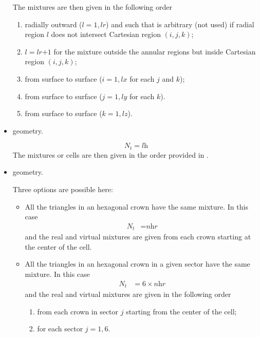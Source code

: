 \begin{itemize}
The mixtures are then given in the following order
\begin{enumerate}
\item radially outward ($l=1,\textit{lr}$) and such that  is arbitrary (not used) if radial region $l$ does not intersect Cartesian region $(i,j,k)$;
\item $l=\textit{lr+1}$ for the mixture outside the annular regions but inside Cartesian region $(i,j,k)$;
\item from surface  to surface  ($i=1,\textit{lx}$ for each $j$ and $k$);
\item from surface  to surface  ($j=1,\textit{ly}$ for each $k$).
\item from surface  to surface  ($k=1,\textit{lz}$).
\end{enumerate}

\item {} geometry.

$$N_{t}=\textit{lh}$$
The mixtures or cells are then given in the order provided in .

\item {} geometry.

Three options are possible here:
\begin{itemize}
\item All the triangles in an hexagonal crown have the same mixture. In this case
\begin{align*}N_{t}&=\textit{nhr}\end{align*}
and the real and virtual mixtures are given from each crown starting at the center of the cell.

\item All the triangles in an hexagonal crown in a given sector have the same mixture. In this case
\begin{align*}N_{t}&=6\times \textit{nhr}\end{align*}
and the real and virtual mixtures are given in the following order 
\begin{enumerate}
\item from each crown in sector $j$ starting from the center of the cell;
\item for each sector $j=1,6$.
\end{enumerate}


\end{itemize}
\end{itemize}
